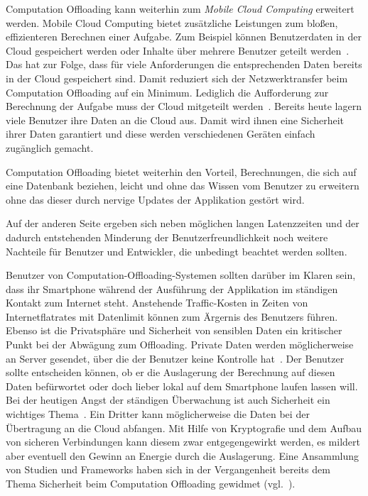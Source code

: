 \documentclass{sigchi}
\begin{document}
Computation Offloading kann weiterhin zum \emph{Mobile Cloud Computing} erweitert werden.
Mobile Cloud Computing bietet zusätzliche Leistungen zum bloßen, effizienteren Berechnen einer Aufgabe.
Zum Beispiel können Benutzerdaten in der Cloud gespeichert werden oder  Inhalte über mehrere Benutzer geteilt werden~\cite{o12}.
Das hat zur Folge, dass für viele Anforderungen die entsprechenden Daten bereits in der Cloud gespeichert sind.
Damit reduziert sich der Netzwerktransfer beim Computation Offloading auf ein Minimum.
Lediglich die Aufforderung zur Berechnung der Aufgabe muss der Cloud mitgeteilt werden~\cite{o12}.
Bereits heute lagern viele Benutzer ihre Daten an die Cloud aus.
Damit wird ihnen eine Sicherheit ihrer Daten garantiert und diese werden verschiedenen Geräten einfach zugänglich gemacht.

Computation Offloading bietet weiterhin den Vorteil, Berechnungen, die sich auf eine Datenbank beziehen, leicht und ohne das Wissen vom Benutzer zu erweitern ohne das dieser durch nervige Updates der Applikation gestört wird.

Auf der anderen Seite ergeben sich neben möglichen langen Latenzzeiten und der dadurch entstehenden Minderung der Benutzerfreundlichkeit noch weitere Nachteile für Benutzer und Entwickler, die unbedingt beachtet werden sollten.

Benutzer von Computation-Offloading-Systemen sollten darüber im Klaren sein, dass ihr Smartphone während der Ausführung der Applikation im ständigen Kontakt zum Internet steht.
Anstehende Traffic-Kosten in Zeiten von Internetflatrates mit Datenlimit können zum Ärgernis des Benutzers führen.
Ebenso ist die Privatsphäre und Sicherheit von sensiblen Daten ein kritischer Punkt bei der Abwägung zum Offloading.
Private Daten werden möglicherweise an Server gesendet, über die der Benutzer keine Kontrolle hat~\cite{o4}.
Der Benutzer sollte entscheiden können, ob er die Auslagerung der Berechnung auf diesen Daten befürwortet oder doch lieber lokal auf dem Smartphone laufen lassen will.
Bei der heutigen Angst der ständigen Überwachung ist auch Sicherheit ein wichtiges Thema~\cite{o4}.
Ein Dritter kann möglicherweise die Daten bei der Übertragung an die Cloud abfangen.
Mit Hilfe von Kryptografie und dem Aufbau von sicheren Verbindungen kann diesem zwar entgegengewirkt werden, es mildert aber eventuell den Gewinn an Energie durch die Auslagerung.
Eine Ansammlung von Studien und Frameworks haben sich in der Vergangenheit bereits dem Thema Sicherheit beim Computation Offloading gewidmet (vgl.~\cite{o4}).
\end{document}
